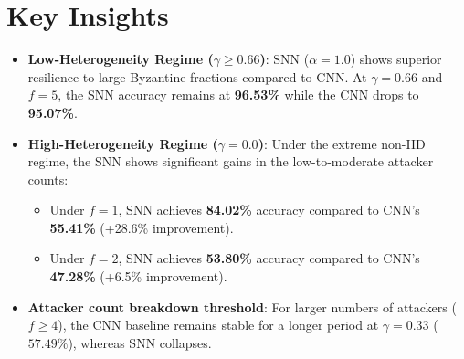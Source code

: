 \documentclass{article}
\begin{document}
\section{Key Insights}
\begin{itemize}
    \item \textbf{Low-Heterogeneity Regime ($\gamma \ge 0.66$)}: SNN ($\alpha=1.0$) shows superior resilience to large Byzantine fractions compared to CNN. At $\gamma=0.66$ and $f=5$, the SNN accuracy remains at \textbf{96.53\%} while the CNN drops to \textbf{95.07\%}.
    \item \textbf{High-Heterogeneity Regime ($\gamma = 0.0$)}: Under the extreme non-IID regime, the SNN shows significant gains in the low-to-moderate attacker counts:
    \begin{itemize}
        \item Under $f=1$, SNN achieves \textbf{84.02\%} accuracy compared to CNN's \textbf{55.41\%} (+28.6\% improvement).
        \item Under $f=2$, SNN achieves \textbf{53.80\%} accuracy compared to CNN's \textbf{47.28\%} (+6.5\% improvement).
    \end{itemize}
    \item \textbf{Attacker count breakdown threshold}: For larger numbers of attackers ($f \ge 4$), the CNN baseline remains stable for a longer period at $\gamma=0.33$ ($57.49\%$), whereas SNN collapses.
\end{itemize}
\end{document}
